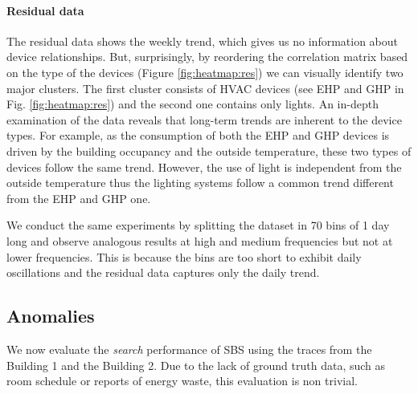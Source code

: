 \paragraph{Residual data}
The residual data shows the weekly trend, which gives us no information about device relationships.
But, surprisingly, by reordering the correlation matrix based on the type of the devices (Figure \ref{fig:heatmap:res}) 
we can visually identify two major clusters.
The first cluster consists of HVAC devices (see EHP and GHP in Fig. \ref{fig:heatmap:res}) and the second one contains only lights. 
An in-depth examination of the data reveals that long-term trends are inherent to the device types. 
For example, as the consumption of both the EHP and GHP devices is driven by the building occupancy and the outside temperature, these two types of devices follow the same trend. 
However, the use of light is independent from the outside temperature thus the lighting systems follow a common trend different from the EHP and GHP one.

We conduct the same experiments by splitting the dataset in 70 bins of 1 day long and observe analogous results at high and medium frequencies but not at lower frequencies.  This is because the bins are too short to exhibit daily oscillations and the residual data captures only the daily trend.


\subsection{Anomalies}
We now evaluate the \emph{search} performance of SBS using the traces from the Building 1 and the Building 2.
Due to the lack of ground truth data, such as room schedule or reports of energy waste, this evaluation is non trivial.


